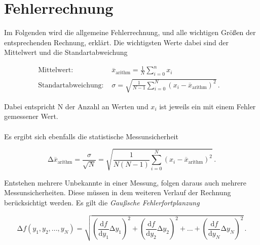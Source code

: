 \section{Fehlerrechnung}
\label{sec:Fehlerrechnung}

Im Folgenden wird die allgemeine Fehlerrechnung, und alle wichtigen Größen der entsprechenden Rechnung, erklärt.
Die wichtigsten Werte dabei sind der Mittelwert und die Standartabweichung

\begin{align}
    \text{Mittelwert:} & \stackrel{_{-}}{x}_{\text{arithm}}  = \frac{1}{N} \sum_{i=0}^{n} x_i & \\
    \text{Standartabweichung: } & \sigma  = \sqrt{\frac{1}{N - 1 } \sum_{i=0}^{N} (x_i -  \stackrel{_{-}}{x}_{\text{arithm}})^2} \, .
\end{align}

Dabei entspricht N der Anzahl an Werten und $x_i$ ist jeweils ein mit einem Fehler gemessener Wert.\\
\\
Es ergibt sich ebenfalls die statistische Messunsicherheit

\begin{equation}
    \increment \stackrel{_{-}}{x}_{\text{arithm}} = \frac{\sigma}{\sqrt{N}} = 
    \sqrt{\frac{1}{N(N - 1)} \sum_{i=0}^{N} (x_i -  \stackrel{_{-}}{x}_{\text{arithm}})^2} \, .
\end{equation} 

Entstehen mehrere Unbekannte in einer Messung, folgen daraus auch mehrere Messunsicherheiten.
Diese müssen in dem weiteren Verlauf der Rechnung berücksichtigt werden.
Es gilt die \textit{Gaußsche Fehlerfortplanzung}

\begin{equation}
    \increment f(y_1 ,y_2 ,...,y_N ) = \sqrt{\left(\frac{\text{d} f}{\text{d} y_{1}} \increment y_{1}\right)^2
    + \left(\frac{\text{d} f}{\text{d} y_{2}} \increment y_{2}\right)^2 + ... + 
    \left(\frac{\text{d} f}{\text{d} y_{N}} \increment y_{N}\right)^2
    } \, .
\end{equation}